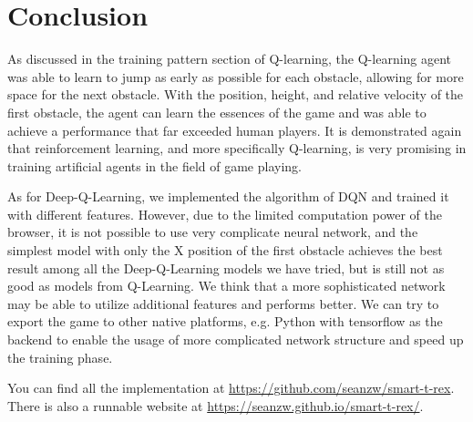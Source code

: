 \documentclass[conference]{IEEEtran}
\begin{document}
\section{Conclusion}
As discussed in the training pattern section of Q-learning, the Q-learning agent was able to learn to jump as early as possible for each obstacle, allowing for more space for the next obstacle. With the position, height, and relative velocity of the first obstacle, the agent can learn the essences of the game and was able to achieve a performance that far exceeded human players. It is demonstrated again that reinforcement learning, and more specifically Q-learning, is very promising in training artificial agents in the field of game playing. 

As for Deep-Q-Learning, we implemented the algorithm of DQN and trained it with different features. However, due to the limited computation power of the browser, it is not possible to use very complicate neural network, and the simplest model with only the X position of the first obstacle achieves the best result among all the Deep-Q-Learning models we have tried, but is still not as good as models from Q-Learning. We think that a more sophisticated network may be able to utilize additional features and performs better. We can try to export the game to other native platforms, e.g. Python with tensorflow as the backend to enable the usage of more complicated network structure and speed up the training phase. 

You can find all the implementation at \url{https://github.com/seanzw/smart-t-rex}. There is also a runnable website at \url{https://seanzw.github.io/smart-t-rex/}.



%
\end{document}
